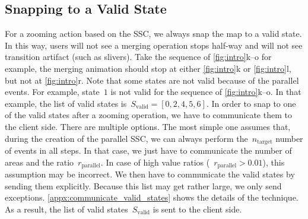 \documentclass[]{interact}
\begin{document}
\subsection{Snapping to a Valid State}
\label{sec:snap}

For a zooming action based on the SSC, 
we always snap the map to a valid state.
In this way, users will not see a merging operation stops half-way
and will not see transition artifact (such as slivers).
Take the sequence of \fig\ref{fig:intro}k--o for example, 
the merging animation should stop at 
either \ref{fig:intro}k or \ref{fig:intro}l,
but not at \ref{fig:intro}r.
Note that some states are not valid because of the parallel events.
For example, state~$1$ is not valid 
for the sequence of \fig\ref{fig:intro}k--o.
In that example, the list of valid states 
is~$S_\mathrm{valid} = [0, 2, 4, 5, 6]$.
In order to snap to one of the valid states after a zooming operation,
we have to communicate them to the client side. 
There are multiple options. 
The most simple one assumes that, 
during the creation of the parallel SSC, 
we can always perform the~$n_\mathrm{target}$ number of events in all steps. 
In that case, we just have to communicate 
the number of areas and the ratio~$r_\mathrm{parallel}$. 
In case of high value ratios (\eg~$r_\mathrm{parallel} > 0.01$), 
this assumption may be incorrect. 
We then have to communicate the valid states by sending them explicitly. 
Because this list may get rather large,
we only send exceptions.
\appx\ref{appx:communicate_valid_states} shows the details of the technique.
As a result, the list of valid states~$S_\mathrm{valid}$ is sent to the client side.
\end{document}
